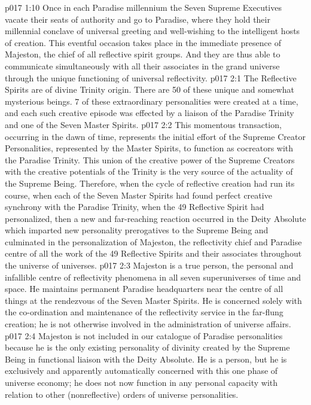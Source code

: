 \vs p017 1:10 Once in each Paradise millennium the Seven Supreme Executives vacate their seats of authority and go to Paradise, where they hold their millennial conclave of universal greeting and well\hyp{}wishing to the intelligent hosts of creation. This eventful occasion takes place in the immediate presence of Majeston, the chief of all reflective spirit groups. And they are thus able to communicate simultaneously with all their associates in the grand universe through the unique functioning of universal reflectivity.
\vs p017 2:1 The Reflective Spirits are of divine Trinity origin. There are 50 of these unique and somewhat mysterious beings. 7 of these extraordinary personalities were created at a time, and each such creative episode was effected by a liaison of the Paradise Trinity and one of the Seven Master Spirits.
\vs p017 2:2 This momentous transaction, occurring in the dawn of time, represents the initial effort of the Supreme Creator Personalities, represented by the Master Spirits, to function as cocreators with the Paradise Trinity. This union of the creative power of the Supreme Creators with the creative potentials of the Trinity is the very source of the actuality of the Supreme Being. Therefore, when the cycle of reflective creation had run its course, when each of the Seven Master Spirits had found perfect creative synchrony with the Paradise Trinity, when the 49 Reflective Spirit had personalized, then a new and far\hyp{}reaching reaction occurred in the Deity Absolute which imparted new personality prerogatives to the Supreme Being and culminated in the personalization of Majeston, the reflectivity chief and Paradise centre of all the work of the 49 Reflective Spirits and their associates throughout the universe of universes.
\vs p017 2:3 Majeston is a true person, the personal and infallible centre of reflectivity phenomena in all seven superuniverses of time and space. He maintains permanent Paradise headquarters near the centre of all things at the rendezvous of the Seven Master Spirits. He is concerned solely with the co\hyp{}ordination and maintenance of the reflectivity service in the far\hyp{}flung creation; he is not otherwise involved in the administration of universe affairs.
\vs p017 2:4 Majeston is not included in our catalogue of Paradise personalities because he is the only existing personality of divinity created by the Supreme Being in functional liaison with the Deity Absolute. He is a person, but he is exclusively and apparently automatically concerned with this one phase of universe economy; he does not now function in any personal capacity with relation to other (nonreflective) orders of universe personalities.
